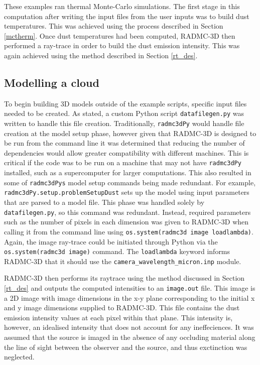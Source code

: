 \documentclass{report}
\begin{document}
These examples ran thermal Monte-Carlo simulations. The first stage in this computation after writing the input files from the user inputs was to build dust temperatures. This was achieved using the process described in Section \ref{mctherm}. Once dust temperatures had been computed, RADMC-3D then performed a ray-trace in order to build the dust emission intensity. This was again achieved using the method described in Section \ref{rt_des}.

\subsection{Modelling a cloud}
To begin building 3D models outside of the example scripts, specific input files needed to be created. As stated, a custom Python script \texttt{datafilegen.py} was written to handle this file creation. Traditionally, \texttt{radmc3dPy} would handle file creation at the model setup phase, however given that RADMC-3D is designed to be run from the command line it was determined that reducing the number of dependencies would allow greater compatibility with different machines. This is critical if the code was to be run on a machine that may not have \texttt{radmc3dPy} installed, such as a supercomputer for larger computations. This also resulted in some of \texttt{radmc3dPy\textquotesingle s} model setup commands being made redundant. For example, \texttt{radmc3dPy.setup.problemSetupDust} sets up the model using input parameters that are parsed to a model file. This phase was handled solely by \texttt{datafilegen.py}, so this command was redundant. Instead, required parameters such as the number of pixels in each dimension was given to RADMC-3D when calling it from the command line using \texttt{os.system(radmc3d image loadlambda)}. Again, the image ray-trace could be initiated through Python via the \texttt{os.system(radmc3d image)} command. The \texttt{loadlambda} keyword informs RADMC-3D that it should use the \texttt{camera\_wavelength\_micron.inp} module.

RADMC-3D then performs its raytrace using the method discussed in Section \ref{rt_des} and outputs the computed intensities to an \texttt{image.out} file. This image is a 2D image with image dimensions in the x-y plane corresponding to the initial x and y image dimensions supplied to RADMC-3D. This file contains the dust emission intensity values at each pixel within that plane. This intensity is, however, an idealised intensity that does not account for any ineffeciences. It was assumed that the source is imaged in the absence of any occluding material along the line of sight between the observer and the source, and thus exctinction was neglected.
\end{document}
